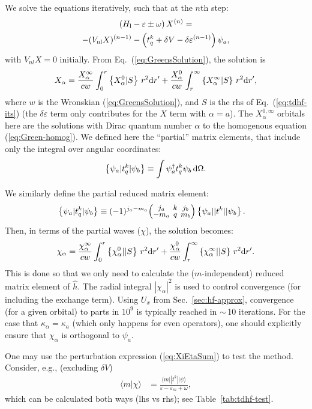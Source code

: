 \documentclass[10pt,twocolumn,a4paper]{article}%
\newcommand{\bra}[1]{\ensuremath{\langle #1|}}	%
\newcommand{\ket}[1]{\ensuremath{|#1\rangle}}
\newcommand{\braket}[1]{\ensuremath{\langle #1\rangle}}	%
\newcommand{\threej}[6]{
\renewcommand\arraystretch{0.75}\setlength\arraycolsep{2pt}
\small\ensuremath{\begin{pmatrix}#1&#2&#3\\#4&#5&#6\end{pmatrix}}
}	%
\newcommand{\be}{\begin{equation}}
\newcommand{\ee}{\end{equation}}
\def\d{\ensuremath{{\rm d}}}
\newcommand{\psidag}{\ensuremath{\psi^\dagger}}	%
\def\en{\ensuremath{\varepsilon}}
\renewcommand{\a}{\ensuremath{\alpha}}
\newcommand{\w}{\ensuremath{\omega}}
\begin{document}
We solve the equations iteratively, such that at the $n$th step:
\begin{multline}\label{eq:tdhf-its}
\left( H_{\rm l} - \en \pm\w \right)X^{(n)} =
 \\
 - (V_{\rm nl} X)^{(n-1)} - \left(t^k_q  + \delta V- \delta \en^{(n-1)} \right)\psi_a,
\end{multline}
with $V_{nl}X= 0$ initially.
From Eq.~(\ref{eq:GreensSolution}), the solution is
\be\label{eq:del-phi-tdhf}
X_\a = \frac{X_\a^\infty}{cw}\int_0^r\left\{X^0_\a|S\right\}\,r^2\d r'
+ \frac{X_\a^0}{cw}\int_r^\infty\left\{X^\infty_\a|S\right\}\,r^2\d r',
\ee
where $w$ is the Wronskian (\ref{eq:GreensSolution}), and $S$ is the rhs of Eq.~(\ref{eq:tdhf-its})
(the $\delta\en$ term only contributes for the $X$ term with $\a=a$).
The $X_\a^{0,\infty}$ orbitals here are the solutions with Dirac quantum number $\a$ to the homogenous equation (\ref{eq:Green-homog}). 
We defined here the ``partial'' matrix elements, that include only the integral over angular coordinates:
\be
\left\{\psi_a|t^k_q|\psi_b\right\} \equiv \int \psidag_a t^k_q\psi_b \,\d\Omega.
\ee




We similarly define the partial reduced matrix element:
\begin{align}\label{eq:partial-rme}
\left\{\psi_a|t^k_q|\psi_b\right\} &\equiv (-1)^{j_a-m_a}{\small\threej{j_a}{k}{j_b}{-m_a}{q}{m_b}}\left\{\psi_a||t^k||\psi_b\right\}.
\end{align}
Then, in terms of the partial waves ($\chi$), the solution becomes:
\be\label{eq:del-phi-tdhf2}
\chi_\a = \frac{\chi_\a^\infty}{cw}\int_0^r\left\{\chi^0_\a||S\right\}\,r^2\d r'
+ \frac{\chi_\a^0}{cw}\int_r^\infty\left\{\chi^\infty_\a||S\right\}\,r^2\d r'.
\ee
This is done so that we only need to calculate the ($m$-independent) {\rm reduced} matrix element of $\hat h$.
The radial integral $|\chi_\a|^2$ is used to control convergence (for including the exchange term).
Using $U_x$ from Sec.~\ref{sec:hf-approx}, convergence (for a given orbital) to parts in $10^9$ is typically reached in $\sim$\,10 iterations.
For the case that $\kappa_\alpha = \kappa_a$ (which only happens for even operators), one should explicitly ensure that $\chi_\alpha$ is orthogonal to $\psi_a$.

One may use the perturbation expression (\ref{eq:XiEtaSum}) to test the method.
Consider, e.g., (excluding $\delta V$)
\begin{align}
\label{eq:tdhf-test}
\braket{m|\chi} &= \frac{\bra{m}|t^k|\ket{\psi}}{\en-\en_m + \omega},
\end{align}
which can be calculated both ways (lhs vs rhs); see Table~\ref{tab:tdhf-test}.
\end{document}
